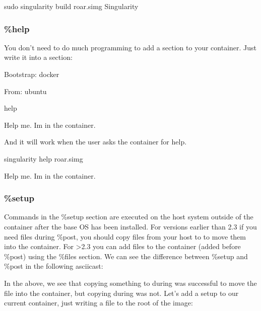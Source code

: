 \documentclass[letterpaper,10pt,english]{sphinxmanual}
\begin{document}
%
\begin{sphinxVerbatim}[commandchars=\\\{\}]
\PYGZdl{} sudo singularity build roar.simg Singularity
\end{sphinxVerbatim}


\subsubsection{\%help}
\label{\detokenize{container_recipes:help}}\label{\detokenize{container_recipes:id2}}\label{\detokenize{container_recipes:sec-help}}
You don’t need to do much programming to add a 
section to your container. Just write it into a section:

%
\begin{sphinxVerbatim}[commandchars=\\\{\}]
Bootstrap: docker

From: ubuntu


\PYGZpc{}help

Help me. I\PYGZsq{}m in the container.
\end{sphinxVerbatim}

And it will work when the user asks the container for help.

%
\begin{sphinxVerbatim}[commandchars=\\\{\}]
\PYGZdl{} singularity help roar.simg

Help me. I\PYGZsq{}m in the container.
\end{sphinxVerbatim}


\subsubsection{\%setup}
\label{\detokenize{container_recipes:setup}}
Commands in the \%setup section are executed on the host system outside
of the container after the base OS has been installed. For versions
earlier than 2.3 if you need files during \%post, you should copy files
from your host to  to move them into the
container. For \textgreater{}2.3 you can add files to the container (added before
\%post) using the \%files section. We can see the difference between
\%setup and \%post in the following asciicast:

In the above, we see that copying something to  during  was successful
to move the file into the container, but copying during  was not. Let’s
add a setup to our current container, just writing a file to the root
of the image:
\end{document}
